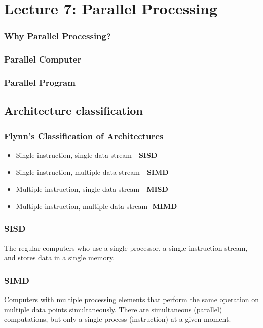 \section{Lecture 7: Parallel Processing}
\subsubsection{Why Parallel Processing?}
\subsubsection{Parallel Computer}
\subsubsection{Parallel Program}

\subsection{Architecture classification}
\subsubsection{Flynn’s Classification of Architectures}
\begin{itemize}
\item Single instruction, single data stream - \textbf{SISD} \\
\item Single instruction, multiple data stream - \textbf{SIMD} \\
\item Multiple instruction, single data stream - \textbf{MISD} \\
\item Multiple instruction, multiple data stream- \textbf{MIMD} \\
\end{itemize}

\subsubsection{SISD}
The regular computers who use a single processor, a single instruction stream, and stores data in a single memory.
\subsubsection{SIMD}
Computers with multiple processing elements that perform the same operation on multiple data points simultaneously. There are simultaneous (parallel) computations, but only a single process (instruction) at a given moment.

